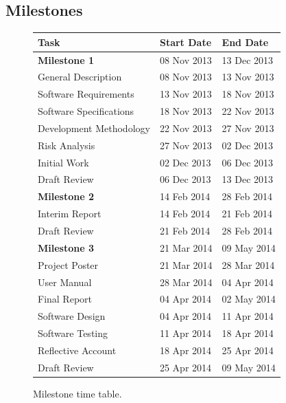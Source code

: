 \documentclass[11pt,a4paper]{article}
\renewcommand{\arraystretch}{1.5}
\begin{document}
\subsection{Milestones}
\label{sec:plan-milestones}

\renewcommand{\arraystretch}{1.5}
\newcommand*{\tableIndent}{\hspace*{0.4cm}}

\begin{figure}[H]
\centering
\begin{tabular}{|l|l|l|}
\hline \textbf{Task} & \textbf{Start Date} & \textbf{End Date} \\ 
\hline \hline \textbf{Milestone 1} & 08 Nov 2013 & 13 Dec 2013 \\ 
\hline\tableIndent General Description & 08 Nov 2013 & 13 Nov 2013 \\ 
\hline\tableIndent Software Requirements & 13 Nov 2013 & 18 Nov 2013 \\ 
\hline\tableIndent Software Specifications & 18 Nov 2013 & 22 Nov 2013 \\ 
\hline\tableIndent Development Methodology & 22 Nov 2013 & 27 Nov 2013 \\ 
\hline\tableIndent Risk Analysis & 27 Nov 2013 & 02 Dec 2013 \\ 
\hline\tableIndent Initial Work  & 02 Dec 2013 & 06 Dec 2013 \\ 
\hline\tableIndent Draft Review  & 06 Dec 2013 & 13 Dec 2013 \\ 
\hline\textbf{Milestone 2} & 14 Feb 2014 & 28 Feb 2014 \\ 
\hline\tableIndent Interim Report & 14 Feb 2014 & 21 Feb 2014 \\ 
\hline\tableIndent Draft Review & 21 Feb 2014 & 28 Feb 2014 \\
\hline\textbf{Milestone 3} & 21 Mar 2014 & 09 May 2014 \\ 
\hline\tableIndent Project Poster & 21 Mar 2014 & 28 Mar 2014 \\ 
\hline\tableIndent User Manual & 28 Mar 2014 & 04 Apr 2014 \\ 
\hline\tableIndent Final Report & 04 Apr 2014 & 02 May 2014 \\
\hline\tableIndent\tableIndent Software Design & 04 Apr 2014 & 11 Apr 2014 \\ 
\hline\tableIndent\tableIndent Software Testing & 11 Apr 2014 & 18 Apr 2014 \\ 
\hline\tableIndent\tableIndent Reflective Account & 18 Apr 2014 & 25 Apr 2014 \\
\hline\tableIndent\tableIndent Draft Review & 25 Apr 2014 & 09 May 2014 \\
\hline 
\end{tabular}

\caption{Milestone time table.\label{fig:milestones-table}}
\end{figure}
\end{document}
